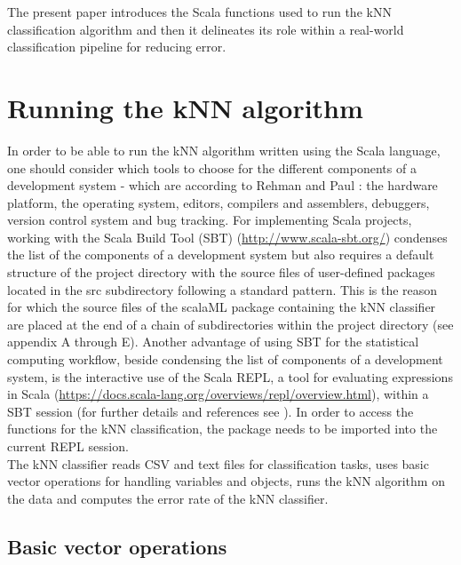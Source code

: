 \documentclass[journal]{IEEEtran}
\begin{document}
      
The present paper introduces the Scala functions used to run the kNN classification algorithm and then it delineates its role within a real-world classification pipeline for reducing error.    
   
\section{Running the kNN algorithm}

In order to be able to run the kNN algorithm written using the Scala language, one should consider which tools to choose for the different components of a development system -  which are according to Rehman and Paul \cite{rehman_linux_2003}: the hardware platform, the operating system, editors, compilers and assemblers, debuggers, version control system and bug tracking.
For implementing Scala projects, working with the Scala Build Tool (SBT) (\href{http://www.scala-sbt.org/}{http://www.scala-sbt.org/}) condenses the list of the components of a development system but also requires a default structure of the project directory with the source files of user-defined packages located in the src subdirectory \cite{suereth_sbt_2016} following a standard pattern. This is the reason for which the source files of the scalaML package containing the kNN classifier are placed at the end of a chain of subdirectories within the project directory (see appendix A through E). 
Another advantage of using SBT for the statistical computing workflow, beside condensing the list of components of a development system, is the interactive use of the Scala REPL, a tool for evaluating expressions in Scala (\href{https://docs.scala-lang.org/overviews/repl/overview.html}{https://docs.scala-lang.org/overviews/repl/overview.html}), within a SBT session (for further details and references see \cite{tesileanu_using_2017}).
In order to access the functions for the kNN classification, the package needs to be imported into the current REPL session.\\


The kNN classifier reads CSV and text files for classification tasks, uses basic vector operations for handling variables and objects, runs the kNN algorithm on the data and computes the error rate of the kNN classifier.

\subsection{Basic vector operations}
\end{document}
